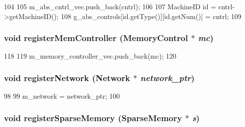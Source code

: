 \begin{DoxyCode}
104 {
105   m_abs_cntrl_vec.push_back(cntrl);
106 
107   MachineID id = cntrl->getMachineID();
108   g_abs_controls[id.getType()][id.getNum()] = cntrl;
109 }
\end{DoxyCode}
\hypertarget{classRubySystem_ac9de1de608e144dd7905a56770e60bfc}{
\subsubsection[{registerMemController}]{\setlength{\rightskip}{0pt plus 5cm}void registerMemController ({\bf MemoryControl} $\ast$ {\em mc})}}
\label{classRubySystem_ac9de1de608e144dd7905a56770e60bfc}



\begin{DoxyCode}
118                                                    {
119     m_memory_controller_vec.push_back(mc);
120 }
\end{DoxyCode}
\hypertarget{classRubySystem_ac1a2d2ecf9164e8b3e11b461abab8521}{
\subsubsection[{registerNetwork}]{\setlength{\rightskip}{0pt plus 5cm}void registerNetwork ({\bf Network} $\ast$ {\em network\_\-ptr})}}
\label{classRubySystem_ac1a2d2ecf9164e8b3e11b461abab8521}



\begin{DoxyCode}
98 {
99   m_network = network_ptr;
100 }
\end{DoxyCode}
\hypertarget{classRubySystem_a7eb79d5477e1c2026d9b1d8b6e26112b}{
\subsubsection[{registerSparseMemory}]{\setlength{\rightskip}{0pt plus 5cm}void registerSparseMemory ({\bf SparseMemory} $\ast$ {\em s})}}
\label{classRubySystem_a7eb79d5477e1c2026d9b1d8b6e26112b}



